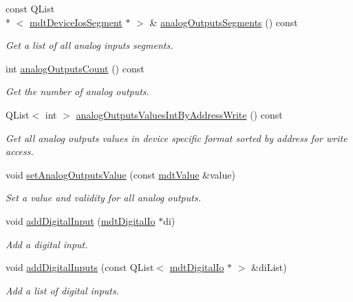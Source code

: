 \begin{DoxyCompactItemize}
const Q\-List\\*
$<$ \hyperlink{classmdt_device_ios_segment}{mdt\-Device\-Ios\-Segment} $\ast$ $>$ \& \hyperlink{classmdt_device_ios_afc425a36dd8942a507d993993bc141a9}{analog\-Outputs\-Segments} () const 
\begin{DoxyCompactList}\small\item\em Get a list of all analog inputs segments. \end{DoxyCompactList}\item 
int \hyperlink{classmdt_device_ios_a8b9b14c4968e5aaae60ac7f91f77e06c}{analog\-Outputs\-Count} () const 
\begin{DoxyCompactList}\small\item\em Get the number of analog outputs. \end{DoxyCompactList}\item 
Q\-List$<$ int $>$ \hyperlink{classmdt_device_ios_afc343f9733f297ee6359455f15308341}{analog\-Outputs\-Values\-Int\-By\-Address\-Write} () const 
\begin{DoxyCompactList}\small\item\em Get all analog outputs values in device specific format sorted by address for write access. \end{DoxyCompactList}\item 
void \hyperlink{classmdt_device_ios_a5d3edb5c95163dbe88ab5f17b6175f2b}{set\-Analog\-Outputs\-Value} (const \hyperlink{classmdt_value}{mdt\-Value} \&value)
\begin{DoxyCompactList}\small\item\em Set a value and validity for all analog outputs. \end{DoxyCompactList}\item 
void \hyperlink{classmdt_device_ios_a023571f5d77bd0874c08b53890a56381}{add\-Digital\-Input} (\hyperlink{classmdt_digital_io}{mdt\-Digital\-Io} $\ast$di)
\begin{DoxyCompactList}\small\item\em Add a digital input. \end{DoxyCompactList}\item 
void \hyperlink{classmdt_device_ios_a470c27db1fefa6cd2a4a690bb0ff04f5}{add\-Digital\-Inputs} (const Q\-List$<$ \hyperlink{classmdt_digital_io}{mdt\-Digital\-Io} $\ast$ $>$ \&di\-List)
\begin{DoxyCompactList}\small\item\em Add a list of digital inputs. \end{DoxyCompactList}\item 

\end{DoxyCompactItemize}
